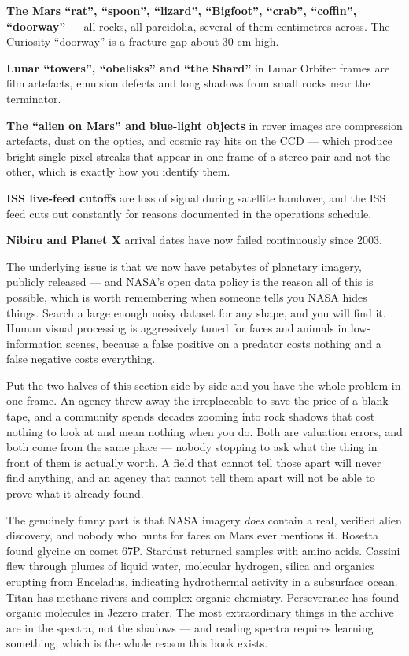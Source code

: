 \textbf{The Mars ``rat'', ``spoon'', ``lizard'', ``Bigfoot'', ``crab'', ``coffin'', ``doorway''} ---
all rocks, all pareidolia, several of them centimetres across. The Curiosity ``doorway'' is a
fracture gap about 30 cm high.

\textbf{Lunar ``towers'', ``obelisks'' and ``the Shard''} in Lunar Orbiter frames are film artefacts,
emulsion defects and long shadows from small rocks near the terminator.

\textbf{The ``alien on Mars'' and blue-light objects} in rover images are compression artefacts,
dust on the optics, and cosmic ray hits on the CCD --- which produce bright single-pixel streaks
that appear in one frame of a stereo pair and not the other, which is exactly how you identify
them.

\textbf{ISS live-feed cutoffs} are loss of signal during satellite handover, and the ISS feed cuts
out constantly for reasons documented in the operations schedule.

\textbf{Nibiru and Planet X} arrival dates have now failed continuously since 2003.

The underlying issue is that we now have petabytes of planetary imagery, publicly released --- and
NASA's open data policy is the reason all of this is possible, which is worth remembering when
someone tells you NASA hides things. Search a large enough noisy dataset for any shape, and you
will find it. Human visual processing is aggressively tuned for faces and animals in
low-information scenes, because a false positive on a predator costs nothing and a false negative
costs everything. 

Put the two halves of this section side by side and you have the whole problem in one frame. An
agency threw away the irreplaceable to save the price of a blank tape, and a community spends decades
zooming into rock shadows that cost nothing to look at and mean nothing when you do. Both are
valuation errors, and both come from the same place --- nobody stopping to ask what the thing in
front of them is actually worth.  A field that
cannot tell those apart will never find anything, and an agency that cannot tell them apart will not
be able to prove what it already found.

\begin{funfact}
The genuinely funny part is that NASA imagery \emph{does} contain a real, verified alien
discovery, and nobody who hunts for faces on Mars ever mentions it. Rosetta found glycine on comet
67P. Stardust returned samples with amino acids. Cassini flew through plumes of liquid water,
molecular hydrogen, silica and organics erupting from Enceladus, indicating hydrothermal activity
in a subsurface ocean. Titan has methane rivers and complex organic chemistry. Perseverance has
found organic molecules in Jezero crater. The most extraordinary things in the archive are in the
spectra, not the shadows --- and reading spectra requires learning something, which is the whole
reason this book exists.
\end{funfact}


